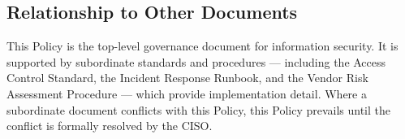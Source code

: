 \subsection{Relationship to Other Documents}
This Policy is the top-level governance document for information security. It is
supported by subordinate standards and procedures --- including the Access Control
Standard, the Incident Response Runbook, and the Vendor Risk Assessment Procedure ---
which provide implementation detail. Where a subordinate document conflicts with this
Policy, this Policy prevails until the conflict is formally resolved by the CISO.
